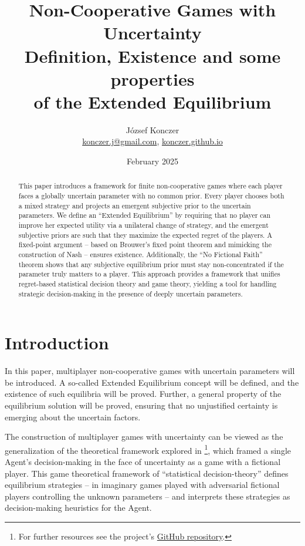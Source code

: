 \documentclass{article}
\title{Non-Cooperative Games with Uncertainty \\
        \large Definition, Existence and some properties \\ of the Extended Equilibrium }
\author{József Konczer  \\
        \href{mailto:konczer.j@gmail.com}{konczer.j@gmail.com},
        \href{https://konczer.github.io/}{konczer.github.io}
        }
\date{February 2025}
\theoremstyle{definition}
\begin{document}
\maketitle

\begin{abstract}
    This paper introduces a framework for finite non-cooperative games where each player faces a globally uncertain parameter with no common prior. Every player chooses both a mixed strategy and projects an emergent subjective prior to the uncertain parameters. We define an ``Extended Equilibrium'' by requiring that no player can improve her expected utility via a unilateral change of strategy, and the emergent subjective priors are such that they maximize the expected regret of the players. A fixed-point argument -- based on Brouwer's fixed point theorem and mimicking the construction of Nash -- ensures existence. Additionally, the ``No Fictional Faith'' theorem shows that any subjective equilibrium prior must stay non-concentrated if the parameter truly matters to a player. 
    This approach provides a framework that unifies regret-based statistical decision theory and game theory, yielding a tool for handling strategic decision-making in the presence of deeply uncertain parameters.
\end{abstract}

\section{Introduction}

In this paper, multiplayer non-cooperative games with uncertain parameters will be introduced. A so-called Extended Equilibrium concept will be defined, and the existence of such equilibria will be proved. Further, a general property of the equilibrium solution will be proved, ensuring that no unjustified certainty is emerging about the uncertain factors.

The construction of multiplayer games with uncertainty can be viewed as the generalization of the theoretical framework explored in \cite{arxiv:StatisticalGames}\footnote{For further resources see the project's \href{https://github.com/Konczer/UncertaintyTheory/tree/main/StatisticalGames}{GitHub repository}.}, which framed a single Agent's decision-making in the face of uncertainty as a game with a fictional player. 
This game theoretical framework of ``statistical decision-theory'' \cite{book:Wald,book:Savage,book:CoxStatistics} defines equilibrium strategies -- in imaginary games played with adversarial fictional players controlling the unknown parameters -- and interprets these strategies as decision-making heuristics for the Agent.
\end{document}
